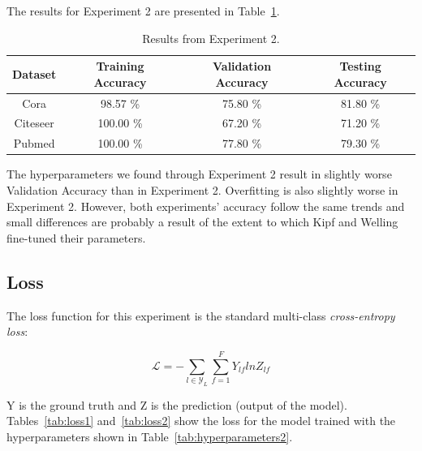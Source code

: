 The results for Experiment 2 are presented in Table~\ref{tab:results2}.

\begin {table}[ht!]
  \begin{center}
    \begin{tabular}{|c|c|c|c|}
    \hline
    Dataset    &  Training Accuracy & Validation Accuracy & Testing Accuracy\\ \hline
    Cora          & 98.57 \% & 75.80 \%  & 81.80 \% \\ 
    Citeseer      & 100.00 \%& 67.20 \%  & 71.20 \% \\
    Pubmed        & 100.00 \%& 77.80 \%  & 79.30 \% \\
    \hline
    \end{tabular}
  \end{center}
\caption {Results from Experiment 2.} \label{tab:results2} 
\end{table}

The hyperparameters we found through Experiment 2 result in slightly worse Validation Accuracy than in Experiment 2. Overfitting is also slightly worse in Experiment 2. However, both experiments' accuracy follow the same trends and small differences are probably a result of the extent to which Kipf and Welling fine-tuned their parameters. 

\subsection{Loss}

The loss function for this experiment is the standard multi-class \textit{cross-entropy loss}:

\begin{equation}
  \label{loss}
  \mathcal{L} = - \sum_{l \in \mathcal{Y}_{L}} \sum_{f=1}^{F} Y_{lf}lnZ_{lf}  
\end{equation}

Y is the ground truth and Z is the prediction (output of the model). Tables~\ref{tab:loss1} and~\ref{tab:loss2} show the loss for the model trained with the hyperparameters shown in Table~\ref{tab:hyperparameters2}.

